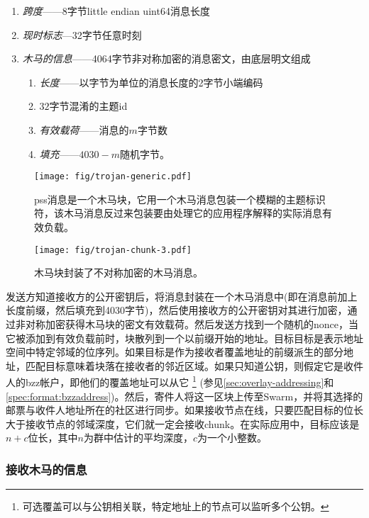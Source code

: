 \begin{enumerate}
    \item \emph{跨度}——8字节little endian uint64消息长度  
    \item \emph{现时标志}—32字节任意时刻 
    \item \emph{木马的信息}——4064字节非对称加密的消息密文，由底层明文组成
\begin{enumerate}
        \item \emph{长度}——以字节为单位的消息长度的2字节小端编码
        \item $32$字节混淆的主题id   
        \item \emph{有效载荷}——消息的$m$字节数 
        \item \emph{填充}——$4030-m$随机字节。
    \end{enumerate}
\end{enumerate}

\begin{figure}[htbp]
\centering
\texttt{[image: fig/trojan-generic.pdf]}
\caption[木马块或pss message\statusgreen]{pss消息是一个木马块，它用一个木马消息包装一个模糊的主题标识符，该木马消息反过来包装要由处理它的应用程序解释的实际消息有效负载。}
\label{fig:trojan-generic}
\end{figure}

\begin{figure}[htbp]
\centering
\texttt{[image: fig/trojan-chunk-3.pdf]}
\caption[木马chunk\statusgreen]{木马块封装了不对称加密的木马消息。}
\label{fig:trojan-chunk}
\end{figure}

发送方知道接收方的公开密钥后，将消息封装在一个木马消息中(即在消息前加上长度前缀，然后填充到4030字节)，然后使用接收方的公开密钥对其进行加密，通过非对称加密获得木马块的密文有效载荷。然后发送方找到一个随机的nonce，当它被添加到有效负载前时，块散列到一个以前缀开始的地址。目标目标是表示地址空间中特定邻域的位序列。如果目标是作为接收者覆盖地址的前缀派生的部分地址，匹配目标意味着块落在接收者的邻近区域。如果只知道公钥，则假定它是收件人的bzz帐户，即他们的覆盖地址可以从它%
%
\footnote{可选覆盖可以与公钥相关联，特定地址上的节点可以监听多个公钥。}
%
(参见\ref{sec:overlay-addressing}和\ref{spec:format:bzzaddress})。然后，寄件人将这一区块上传至Swarm，并将其选择的邮票与收件人地址所在的社区进行同步。如果接收节点在线，只要匹配目标的位长大于接收节点的邻域深度，它们就一定会接收chunk。在实际应用中，目标应该是$n+c$位长，其中$n$为群中估计的平均深度，$c$为一个小整数。 

\subsubsection{接收木马的信息}

